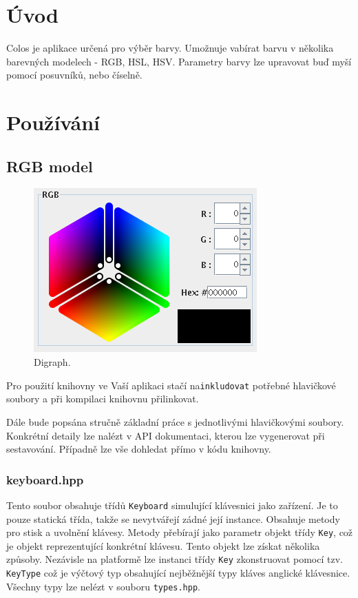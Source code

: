 \documentclass[12pt]{article}
\newcommand{\code}[1]{\texttt{#1}}
\begin{document}


\tableofcontents
\newpage

\section{Úvod}
Colos je aplikace určená pro výběr barvy. Umožnuje vabírat barvu v několika barevných modelech - RGB, HSL, HSV. Parametry barvy lze upravovat buď myší pomocí posuvníků, nebo číselně.

\section{Používání}
    \subsection{RGB model}
    \begin{figure}[!htb]
\centering
\includegraphics[scale=0.7]{rgb}
\caption{Digraph.}
\label{fig:digraph}
\end{figure}
    Pro použití knihovny ve Vaší aplikaci stačí na\code{inkludovat} potřebné hlavičkové soubory a při kompilaci knihovnu přilinkovat.

    Dále bude popsána stručně základní práce s jednotlivými hlavičkovými soubory.
    Konkrétní detaily lze nalézt v API dokumentaci, kterou lze vygenerovat při sestavování. Případně lze vše dohledat přímo v kódu knihovny.

    \subsubsection{keyboard.hpp}
    Tento soubor obsahuje třídů \code{Keyboard} simulující klávesnici jako zařízení. Je to pouze statická třída, takže se nevytvářejí zádné její instance. Obsahuje metody pro stisk a uvolnění klávesy. Metody přebírají jako parametr objekt třídy \code{Key}, což je objekt reprezentující konkrétní klávesu. Tento objekt lze získat několika způsoby. Nezávisle na platformě lze instanci třídy \code{Key} zkonstruovat pomocí tzv. \code{KeyType} což je výčtový typ obsahující nejběžnější typy kláves anglické klávesnice. Všechny typy lze nelézt v souboru \code{types.hpp}.
        
\end{document}
